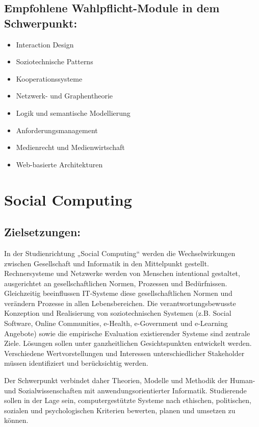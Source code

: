 \section*{Empfohlene Wahlpflicht-Module in dem
Schwerpunkt:}\label{empfohlene-wahlpflicht-module-in-dem-schwerpunkt-1}

\begin{itemize}
\item
  Interaction Design
\item
  Soziotechnische Patterns
\item
  Kooperationssysteme
\item
  Netzwerk- und Graphentheorie
\item
  Logik und semantische Modellierung
\item
  Anforderungsmanagement
\item
  Medienrecht und Medienwirtschaft
\item
  Web-basierte Architekturen
\end{itemize}

\chapter{Social Computing}\label{social-computing}

\section*{Zielsetzungen:}\label{zielsetzungen-1}

In der Studienrichtung „Social Computing`` werden die Wechselwirkungen
zwischen Gesellschaft und Informatik in den Mittelpunkt gestellt.
Rechnersysteme und Netzwerke werden von Menschen intentional gestaltet,
ausgerichtet an gesellschaftlichen Normen, Prozessen und Bedürfnissen.
Gleichzeitig beeinflussen IT-Systeme diese gesellschaftlichen Normen und
verändern Prozesse in allen Lebensbereichen. Die verantwortungsbewusste
Konzeption und Realisierung von soziotechnischen Systemen (z.B. Social
Software, Online Communities, e-Health, e-Government und e-Learning
Angebote) sowie die empirische Evaluation existierender Systeme sind
zentrale Ziele. Lösungen sollen unter ganzheitlichen Gesichtspunkten
entwickelt werden. Verschiedene Wertvorstellungen und Interessen
unterschiedlicher Stakeholder müssen identifiziert und berücksichtig
werden.

Der Schwerpunkt verbindet daher Theorien, Modelle und Methodik der
Human- und Sozialwissenschaften mit anwendungsorientierter Informatik.
Studierende sollen in der Lage sein, computergestützte Systeme nach
ethischen, politischen, sozialen und psychologischen Kriterien bewerten,
planen und umsetzen zu können.

